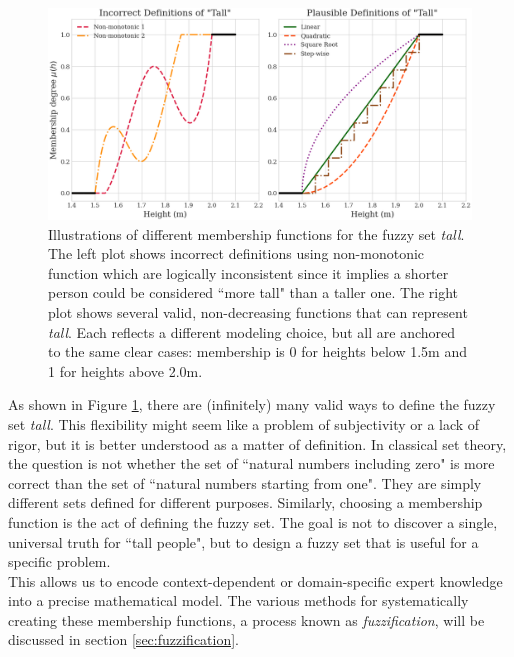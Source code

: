 \begin{figure}[!ht]
    \centering
    \includegraphics[width=\textwidth]{ch1/figures/Fuzzy_tall.png}
    \caption{Illustrations of different membership functions for the fuzzy set \emph{tall}. The left plot shows incorrect definitions using non-monotonic function which are logically inconsistent since it implies a shorter person could be considered ``more tall" than a taller one. The right plot shows several valid, non-decreasing functions that can represent \emph{tall}. Each reflects a different modeling choice, but all are anchored to the same clear cases: membership is 0 for heights below 1.5m and 1 for heights above 2.0m.}
    \label{fig:tall_definitions}
\end{figure}

As shown in Figure \ref{fig:tall_definitions}, there are (infinitely) many valid ways to define the fuzzy set \emph{tall}. This flexibility might seem like a problem of subjectivity or a lack of rigor, but it is better understood as a matter of definition. In classical set theory, the question is not whether the set of ``natural numbers including zero" is more correct than the set of ``natural numbers starting from one". They are simply different sets defined for different purposes. Similarly, choosing a membership function is the act of defining the fuzzy set. The goal is not to discover a single, universal truth for ``tall people", but to design a fuzzy set that is useful for a specific problem. \\

This allows us to encode context-dependent or domain-specific expert knowledge into a precise mathematical model. The various methods for systematically creating these membership functions, a process known as \textit{fuzzification}, will be discussed in section \ref{sec:fuzzification}.\\

